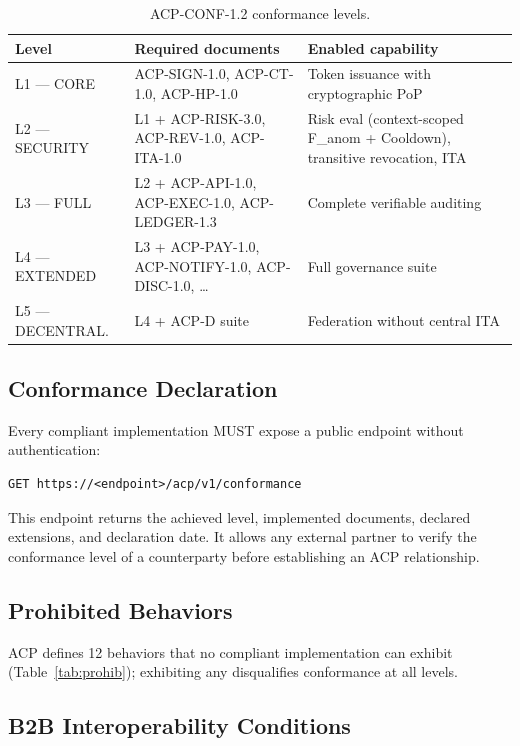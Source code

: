 \documentclass[11pt]{article}
\theoremstyle{definition}
\begin{document}
\begin{table}[h!]
\centering
\small
\begin{tabular}{@{}lll@{}}
\toprule
\textbf{Level} & \textbf{Required documents} & \textbf{Enabled capability} \\
\midrule
L1 --- CORE & ACP-SIGN-1.0, ACP-CT-1.0, ACP-HP-1.0 & Token issuance with cryptographic PoP \\
L2 --- SECURITY & L1 + ACP-RISK-3.0, ACP-REV-1.0, ACP-ITA-1.0 & Risk eval (context-scoped F\_anom + Cooldown), transitive revocation, ITA \\
L3 --- FULL & L2 + ACP-API-1.0, ACP-EXEC-1.0, ACP-LEDGER-1.3 & Complete verifiable auditing \\
L4 --- EXTENDED & L3 + ACP-PAY-1.0, ACP-NOTIFY-1.0, ACP-DISC-1.0, \ldots & Full governance suite \\
L5 --- DECENTRAL. & L4 + ACP-D suite & Federation without central ITA \\
\bottomrule
\end{tabular}
\caption{ACP-CONF-1.2 conformance levels.}
\end{table}

\subsection{Conformance Declaration}

Every compliant implementation MUST expose a public endpoint without authentication:
\begin{lstlisting}
GET https://<endpoint>/acp/v1/conformance
\end{lstlisting}
This endpoint returns the achieved level, implemented documents, declared extensions, and declaration date.
It allows any external partner to verify the conformance level of a counterparty before establishing an ACP relationship.

\subsection{Prohibited Behaviors}

ACP defines 12 behaviors that no compliant implementation can exhibit (Table~\ref{tab:prohib});
exhibiting any disqualifies conformance at all levels.

\subsection{B2B Interoperability Conditions}
\end{document}

